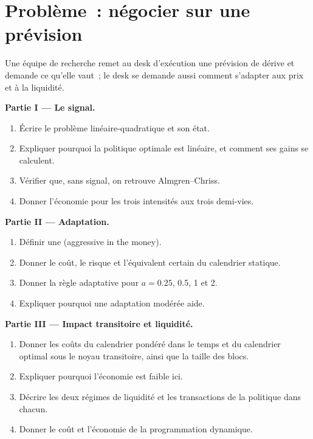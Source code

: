 \section{Problème~: négocier sur une prévision}

\begin{problem}\label{pb:mx:beyond-almgren-chriss:1}
Une équipe de recherche remet au desk d'exécution une prévision de dérive et demande ce qu'elle vaut~; le desk se demande aussi comment s'adapter aux prix et à la liquidité.

\medskip\noindent\textbf{Partie I --- Le signal.}
\begin{enumerate}
\item Écrire le problème linéaire-quadratique et son état.
\item Expliquer pourquoi la politique optimale est linéaire, et comment ses gains se calculent.
\item Vérifier que, sans signal, on retrouve Almgren--Chriss.
\item Donner l'économie pour les trois intensités aux trois demi-vies.
\end{enumerate}

\medskip\noindent\textbf{Partie II --- Adaptation.}
\begin{enumerate}[resume]
\item Définir une  (aggressive in the money).
\item Donner le coût, le risque et l'équivalent certain du calendrier statique.
\item Donner la règle adaptative pour $a=0.25$, 0.5, 1 et 2.
\item Expliquer pourquoi une adaptation modérée aide.
\end{enumerate}

\medskip\noindent\textbf{Partie III --- Impact transitoire et liquidité.}
\begin{enumerate}[resume]
\item Donner les coûts du calendrier pondéré dans le temps et du calendrier optimal sous le noyau transitoire, ainsi que la taille des blocs.
\item Expliquer pourquoi l'économie est faible ici.
\item Décrire les deux régimes de liquidité et les transactions de la politique dans chacun.
\item Donner le coût et l'économie de la programmation dynamique.
\end{enumerate}


\end{problem}
